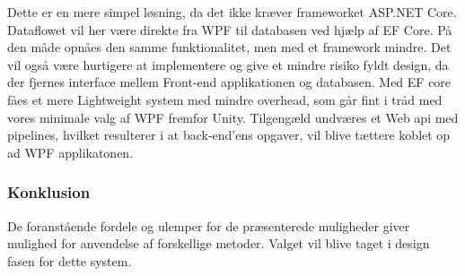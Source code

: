 Dette er en mere simpel løsning, da det ikke kræver frameworket ASP.NET Core. Dataflowet vil her være direkte fra WPF til databasen ved hjælp af EF Core. På den måde opnåes den samme funktionalitet, men med et framework mindre. Det vil også være hurtigere at implementere og give et mindre risiko fyldt design, da der fjernes interface mellem Front-end applikationen og databasen. Med EF core fåes et mere Lightweight system med mindre overhead, som går fint i tråd med vores minimale valg af WPF fremfor Unity. Tilgengæld undværes et Web api med pipelines, hvilket resulterer i at back-end’ens opgaver, vil blive tættere koblet op ad WPF applikatonen.\\

\subsubsection{Konklusion}

De foranstående fordele og ulemper for de præsenterede muligheder giver mulighed for anvendelse af forskellige metoder. Valget vil blive taget i design fasen for dette system.\\



\newpage
